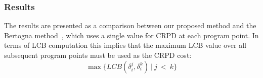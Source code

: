 \subsubsection{Results}
The results are presented as a comparison between our proposed method and the Bertogna method~\cite{bertogna:11}, which uses a single value for CRPD at each program point.  In terms of LCB computation this implies that the maximum LCB value over all subsequent program points must be used as the CRPD cost:
\begin{equation}
  \max\{LCB(\delta_i^j,\delta_i^k)\ \vert\ j\ <\ k\}
\end{equation}
%

